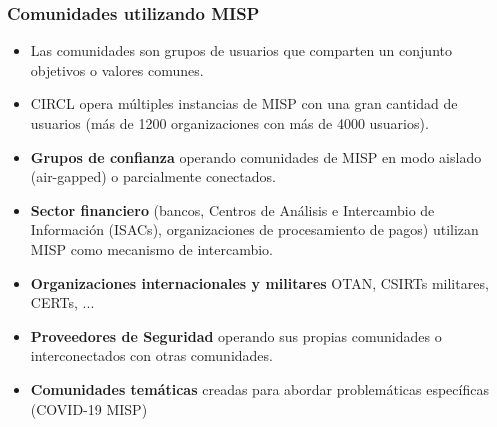 \begin{frame}
 \frametitle{Comunidades utilizando MISP}
 \begin{itemize}
     \item Las comunidades son grupos de usuarios que comparten un conjunto objetivos o valores comunes.
     \item CIRCL opera múltiples instancias de MISP con una gran cantidad de usuarios (más de 1200 organizaciones con más de 4000 usuarios).
         \item {\bf Grupos de confianza} operando comunidades de MISP en modo aislado (air-gapped) o parcialmente conectados.
     \item {\bf Sector financiero} (bancos, Centros de Análisis e Intercambio de Información (ISACs), organizaciones de procesamiento de pagos) utilizan MISP como mecanismo de intercambio.
     \item {\bf Organizaciones internacionales y militares} OTAN, CSIRTs militares, CERTs, ...
     \item {\bf Proveedores de Seguridad} operando sus propias comunidades o interconectados con otras comunidades.
         \item {\bf Comunidades temáticas} creadas para abordar problemáticas específicas (COVID-19 MISP)
 \end{itemize}
\end{frame}

